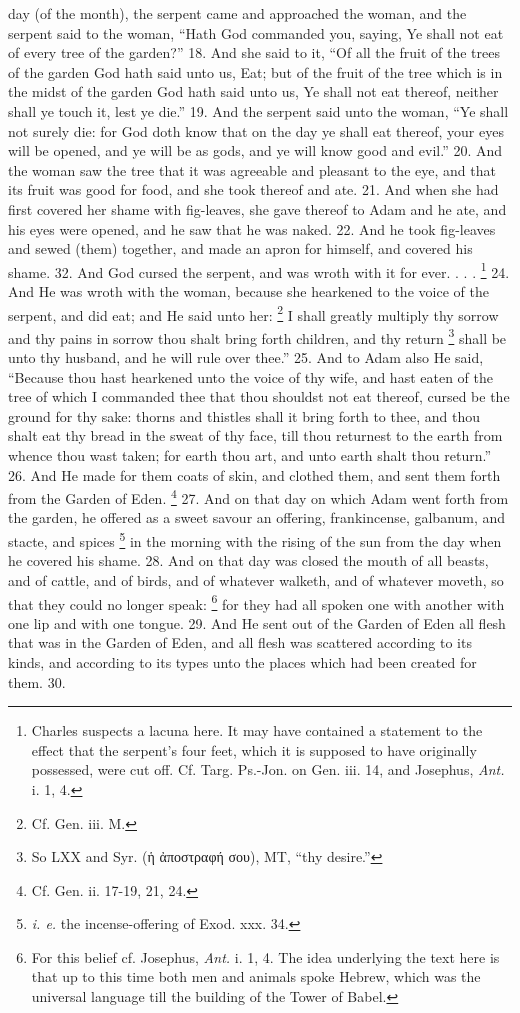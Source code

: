 day (of the month), the serpent came and approached the woman, and the serpent said to the woman, ``Hath God commanded you, saying, Ye shall not eat of every tree of the garden?'' 18. And she said to it, ``Of all the fruit of the trees of the garden God hath said unto us, Eat; but of the fruit of the tree which is in the midst of the garden God hath said unto us, Ye shall not eat thereof, neither shall ye touch it, lest ye die.'' 19. And the serpent said unto the woman, ``Ye shall not surely die: for God doth know that on the day ye shall eat thereof, your eyes will be opened, and ye will be as gods, and ye will know good and evil.'' 20. And the woman saw the tree that it was agreeable and pleasant to the eye, and that its fruit was good for food, and she took thereof and ate. 21. And when she had first covered her shame with fig-leaves, she gave thereof to Adam and he ate, and his eyes were opened, and he saw that he was naked. 22. And he took fig-leaves and sewed (them) together, and made an apron for himself, and covered his shame. 32. And God cursed the serpent, and was wroth with it for ever. . . . \footnote{Charles suspects a lacuna here. It may have contained a statement to the effect that the serpent's four feet, which it is supposed to have originally possessed, were cut off. Cf. Targ. Ps.-Jon. on Gen. iii. 14, and Josephus, \emph{Ant.} i. 1, 4.} 24. And He was wroth with the woman, because she hearkened to the voice of the serpent, and did eat; and He said unto her: \footnote{Cf. Gen. iii. M.} I shall greatly multiply thy sorrow and thy pains in sorrow thou shalt bring forth children, and thy return \footnote{So LXX and Syr. (\textgreek{ἡ ἀποστραφή σου}), MT, ``thy desire.''} shall be unto thy husband, and he will rule over thee.'' 25. And to Adam also He said, ``Because thou hast hearkened unto the voice of thy wife, and hast eaten of the tree of which I commanded thee that thou shouldst not eat thereof, cursed be the ground for thy sake: thorns and thistles shall it bring forth to thee, and thou shalt eat thy bread in the sweat of thy face, till thou returnest to the earth from whence thou wast taken; for earth thou art, and unto earth shalt thou return.'' 26. And He made for them coats of skin, and clothed them, and sent them forth from the Garden of Eden. \footnote{Cf. Gen. ii. 17-19, 21, 24.} 27. And on that day on which Adam went forth from the garden, he offered as a sweet savour an offering, frankincense, galbanum, and stacte, and spices \footnote{\emph{i. e.} the incense-offering of Exod. xxx. 34.} in the morning with the rising of the sun from the day when he covered his shame. 28. And on that day was closed the mouth of all beasts, and of cattle, and of birds, and of whatever walketh, and of whatever moveth, so that they could no longer speak: \footnote{For this belief cf. Josephus, \emph{Ant.} i. 1, 4. The idea underlying the text here is that up to this time both men and animals spoke Hebrew, which was the universal language till the building of the Tower of Babel.} for they had all spoken one with another with one lip and with one tongue. 29. And He sent out of the Garden of Eden all flesh that was in the Garden of Eden, and all flesh was scattered according to its kinds, and according to its types unto the places which had been created for them. 30. 